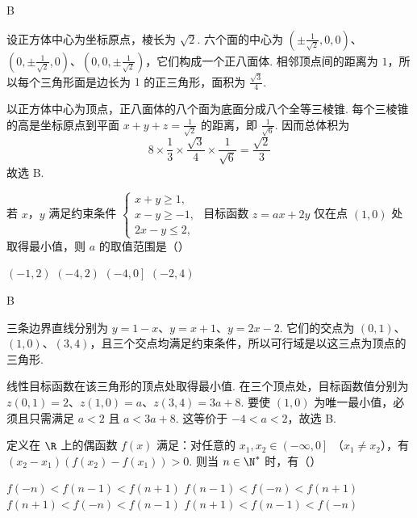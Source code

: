 \begin{answer}
B
\end{answer}

\begin{solution}
设正方体中心为坐标原点，棱长为 \(\sqrt{2}\). 六个面的中心为
\(\left(\pm\frac{1}{\sqrt{2}},0,0\right)\)、\(\left(0,\pm\frac{1}{\sqrt{2}},0\right)\)、\(\left(0,0,\pm\frac{1}{\sqrt{2}}\right)\)，它们构成一个正八面体. 相邻顶点间的距离为 \(1\)，所以每个三角形面是边长为 \(1\) 的正三角形，面积为 \(\frac{\sqrt{3}}{4}\).

以正方体中心为顶点，正八面体的八个面为底面分成八个全等三棱锥. 每个三棱锥的高是坐标原点到平面 \(x+y+z=\frac{1}{\sqrt{2}}\) 的距离，即 \(\frac{1}{\sqrt{6}}\). 因而总体积为
\[
8\times\frac{1}{3}\times\frac{\sqrt{3}}{4}\times\frac{1}{\sqrt{6}}=\frac{\sqrt{2}}{3}
\]
故选 B.
\end{solution}

\begin{problem}
若 \(x\)，\(y\) 满足约束条件 \(\begin{cases}
x + y \geqslant 1,\\
x - y \geqslant -1,\\
2x - y \leqslant 2,
\end{cases}\) 目标函数 \(z = ax + 2y\) 仅在点 \(\left(1,0\right)\) 处取得最小值，则 \(a\) 的取值范围是（\quad）

\choices
    {\(\left(-1, 2\right)\)}
    {\(\left(-4, 2\right)\)}
    {\(\left(-4, 0\right]\)}
    {\(\left(-2, 4\right)\)}

\end{problem}

\begin{answer}
B
\end{answer}

\begin{solution}
三条边界直线分别为 \(y=1-x\)、\(y=x+1\)、\(y=2x-2\). 它们的交点为 \((0,1)\)、\((1,0)\)、\((3,4)\)，且三个交点均满足约束条件，所以可行域是以这三点为顶点的三角形.

线性目标函数在该三角形的顶点处取得最小值. 在三个顶点处，目标函数值分别为 \(z(0,1)=2\)、\(z(1,0)=a\)、\(z(3,4)=3a+8\). 要使 \((1,0)\) 为唯一最小值，必须且只需满足 \(a<2\) 且 \(a<3a+8\).
这等价于 \(-4<a<2\)，故选 B.
\end{solution}

\begin{problem}
定义在 \(\R\) 上的偶函数 \(f\left(x\right)\) 满足：对任意的 \(x_{1}, x_{2} \in \left(-\infty, 0\right]\) （\(x_{1} \neq x_{2}\)），有 \(\left(x_{2} - x_{1}\right)\left(f\left(x_{2}\right) - f\left(x_{1}\right)\right) > 0\). 则当 \(n \in \N^{*}\) 时，有（\quad）

\choices
    {\(f\left(-n\right) < f\left(n - 1\right) < f\left(n + 1\right)\)}
    {\(f\left(n - 1\right) < f\left(-n\right) < f\left(n + 1\right)\)}
    {\(f\left(n + 1\right) < f\left(-n\right) < f\left(n - 1\right)\)}
    {\(f\left(n + 1\right) < f\left(n - 1\right) < f\left(-n\right)\)}

\end{problem}

